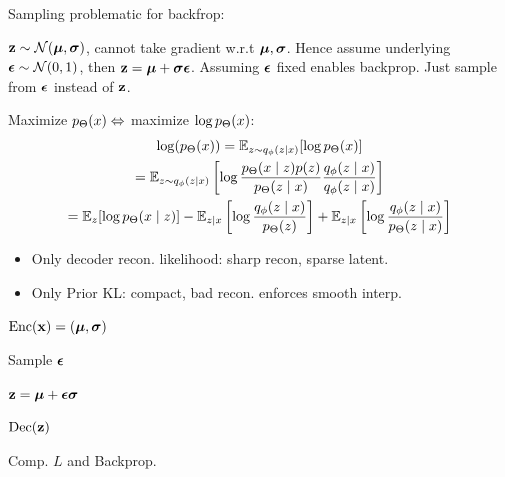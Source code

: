 \begin{definition}[Reparameterization]
    Sampling problematic for backfrop:
    
    \(\vb{z} \sim \operatorname{\mathcal{N}}(\vb*{\mu}, \vb*{\sigma})\), cannot take gradient w.r.t \(\vb*{\mu}, \vb*{\sigma}\). Hence assume underlying \(\vb*{\epsilon} \sim \operatorname{\mathcal{N}}(0, 1)\), then \(\vb{z} = \vb*{\mu} + \vb*{\sigma}\vb*{\epsilon}\). Assuming \(\vb*{\epsilon}\) fixed enables backprop. Just sample from \(\vb*{\epsilon}\) instead of \(\vb{z}\).
\end{definition}

\begin{colored}
\begin{definition}[Training]
    Maximize \(p_\Theta(x) \Leftrightarrow \) maximize \(\log p_\Theta(x)\):
    \begin{gather*}
        \log(p_\Theta(x)) = \mathbb{E}_{z \sim q_\phi(z \mid x)}[\log p_\Theta(x)] \\
        = \mathbb{E}_{z \sim q_\phi(z \mid x)}\left[\log \frac{p_\Theta(x \mid z) p(z)}{p_\Theta(z \mid x)} \frac{q_\phi(z \mid x)}{q_\phi(z \mid x)}\right] \\
        = \mathbb{E}_z[\log p_\Theta(x \mid z)] - \mathbb{E}_{z\mid x}\left[\log \frac{q_\phi(z \mid x)}{p_\Theta(z)}\right] + \mathbb{E}_{z \mid x}\left[\log\frac{q_\phi(z \mid x)}{p_\Theta(z \mid x)}\right]
    \end{gather*}
    \begin{itemize}
        \item Only decoder recon. likelihood: sharp recon, sparse latent.
        \item Only Prior KL: compact, bad recon. enforces smooth interp.
    \end{itemize}
\end{definition}

\begin{enumerate*}
    \item \(\text{Enc}(\vb{x}) = (\vb*{\mu}, \vb*{\sigma})\)
    \item Sample \(\vb*{\epsilon}\)
    \item \(\vb{z} = \vb*{\mu} + \vb*{\epsilon}\vb*{\sigma}\)
    \item \(\text{Dec}(\vb{z})\)
    \item Comp. \(L\) and Backprop.
\end{enumerate*}
\end{colored}

